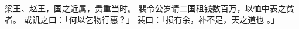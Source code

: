 
\switchcolumn*[\section{}]

梁王、赵王，国之近属，贵重当时。
裴令公岁请二国租钱数百万，以恤中表之贫者。
或讥之曰：「何以乞物行惠？」
裴曰：「损有余，补不足，天之道也 。」

\switchcolumn



